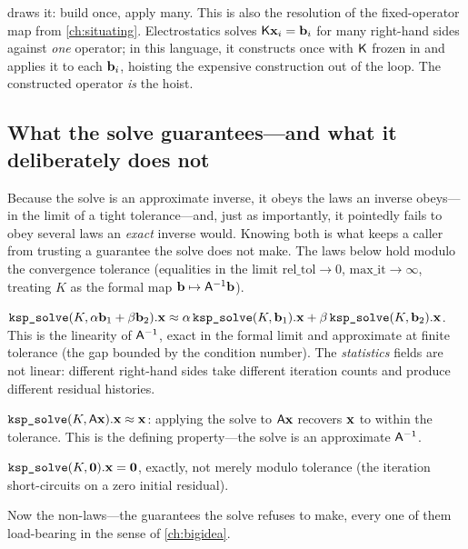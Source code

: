  draws it: build once, apply many. This is also the resolution
of the fixed-operator map from \cref{ch:situating}. Electrostatics solves
$\mathsf{K}\mathbf{x}_i=\mathbf{b}_i$ for many right-hand sides against \emph{one} operator; in this
language, it constructs  once with $\mathsf{K}$ frozen in and applies it to
each $\mathbf{b}_i$, hoisting the expensive construction out of the loop. The constructed
operator \emph{is} the hoist.

\subsection{What the solve guarantees---and what it deliberately does not}
\label{sec:krylov-laws}

Because the solve is an approximate inverse, it obeys the laws an inverse obeys---in
the limit of a tight tolerance---and, just as importantly, it pointedly fails to
obey several laws an \emph{exact} inverse would. Knowing both is what keeps a caller
from trusting a guarantee the solve does not make. The laws below hold modulo the
convergence tolerance (equalities in the limit $\text{rel\_tol}\to0$,
$\text{max\_it}\to\infty$, treating $K$ as the formal map $\mathbf{b}\mapsto\mathsf{A}^{-1}\mathbf{b}$).

\begin{description}[style=nextline, leftmargin=1.4em]
  \item[Linearity in the right-hand side.] $\texttt{ksp\_solve}(K,\alpha\mathbf{b}_1+\beta\mathbf{b}_2).\mathbf{x}
  \approx \alpha\,\texttt{ksp\_solve}(K,\mathbf{b}_1).\mathbf{x} + \beta\,\texttt{ksp\_solve}(K,\mathbf{b}_2).\mathbf{x}$.
  This is the linearity of $\mathsf{A}^{-1}$, exact in the formal limit and approximate
  at finite tolerance (the gap bounded by the condition number). The
  \emph{statistics} fields are not linear: different right-hand sides take different
  iteration counts and produce different residual histories.
  \item[Near-inverse on the right-hand side.] $\texttt{ksp\_solve}(K,\mathsf{A}\mathbf{x}).\mathbf{x}
  \approx \mathbf{x}$: applying the solve to $\mathsf{A}\mathbf{x}$ recovers $\mathbf{x}$ to within the
  tolerance. This is the defining property---the solve is an approximate
  $\mathsf{A}^{-1}$.
  \item[Zero right-hand side gives zero.] $\texttt{ksp\_solve}(K,\mathbf{0}).\mathbf{x}=\mathbf{0}$,
  exactly, not merely modulo tolerance (the iteration short-circuits on a zero
  initial residual).
\end{description}

Now the non-laws---the guarantees the solve refuses to make, every one of them
load-bearing in the sense of \cref{ch:bigidea}.

